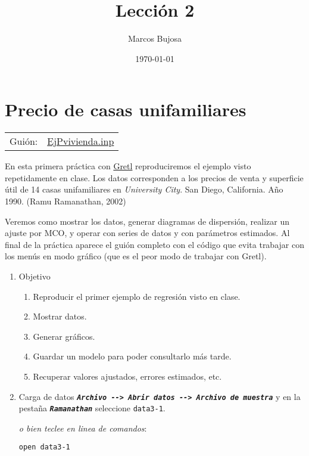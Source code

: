 \documentclass[11pt]{article}
\author{Marcos Bujosa}
\date{\today}
\title{Lección 2}
\begin{document}
\maketitle
\tableofcontents

\clearpage
\section{Precio de casas unifamiliares}
\label{sec:org0eafe95}
\begin{center}
\begin{tabular}{ll}
Guión: & \href{https://github.com/mbujosab/Ectr/tree/master/Practicas/Gretl/scripts/EjPvivienda.inp}{EjPvivienda.inp}\\[0pt]
\end{tabular}
\end{center}

En esta primera práctica con \href{https://gretl.sourceforge.net/es.html}{Gretl} reproduciremos el ejemplo visto
repetidamente en clase. Los datos corresponden a los precios de venta y
superficie útil de 14 casas unifamiliares en \emph{University City}. San
Diego, California. Año 1990. (Ramu Ramanathan, 2002)

Veremos como mostrar los datos, generar diagramas de dispersión,
realizar un ajuste por MCO, y operar con series de datos y con
parámetros estimados. Al final de la práctica aparece el guión
completo con el código que evita trabajar con los menús en modo
gráfico (que es el peor modo de trabajar con Gretl).


\begin{enumerate}
\item Objetivo
\label{sec:org7a81a57}
\begin{enumerate}
\item Reproducir el primer ejemplo de regresión visto en clase.

\item Mostrar datos.
\item Generar gráficos.
\item Guardar un modelo para poder consultarlo más tarde.
\item Recuperar valores ajustados, errores estimados, etc.
\end{enumerate}

\item Carga de datos
\label{sec:orgc67a109}
\textbf{\emph{\texttt{Archivo -{}-> Abrir datos -{}-> Archivo de muestra}}} y en la pestaña
\textbf{\emph{\texttt{Ramanathan}}} seleccione \texttt{data3-1}.

{\vspace{0pt} \footnotesize \color{gray!70!black}
\emph{o bien teclee en linea de comandos}:
\begin{verbatim}
open data3-1
\end{verbatim}
}
\end{enumerate}
\end{document}
